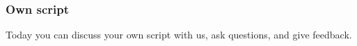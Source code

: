 \begin{frame}
    \frametitle{Own script}

    Today you can discuss your own script with us,
    ask questions,
    and give feedback.

\end{frame}